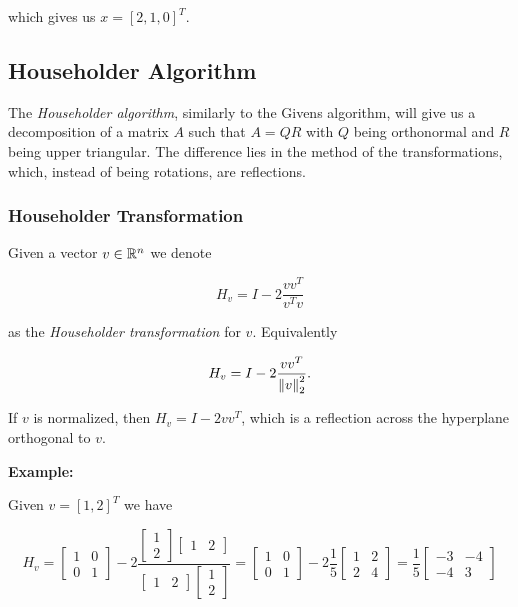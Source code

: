 which gives us \(x = [2, 1, 0]^T\).

\subsection{Householder Algorithm}

The \emph{Householder algorithm}, similarly to the Givens algorithm, will give us a decomposition of a matrix \(A\) 
such that \(A = QR\) with \(Q\) being orthonormal and \(R\) being upper triangular. The difference lies in the method of the transformations, 
which, instead of being rotations, are reflections.

\subsubsection{Householder Transformation}

Given a vector \(v \in \mathbb{R}^n\) we denote 

\[
    H_v = I - 2 \frac{vv^T}{v^Tv}
\]

as the \emph{Householder transformation} for \(v\). Equivalently 

\[
    H_v = I - 2 \frac{vv^T}{\left\| v \right\|_2^2}.
\]

If \(v\) is normalized, then \(H_v = I - 2 vv^T\), which is a reflection across the hyperplane orthogonal to \(v\).

\textbf{Example:}

Given \(v = [1, 2]^T\) we have

\[
    H_v = 
    \begin{bmatrix}
        1 & 0 \\ 
        0 & 1
    \end{bmatrix}
    - 2
    \frac{
        \begin{bmatrix}
            1 \\ 2
        \end{bmatrix}
        \begin{bmatrix}
            1 & 2
        \end{bmatrix}
    }{\begin{bmatrix}
        1 & 2
    \end{bmatrix}    
    \begin{bmatrix}
        1 \\ 2
    \end{bmatrix}}
    =
    \begin{bmatrix}
        1 & 0 \\ 
        0 & 1
    \end{bmatrix}
    - 2 \frac{1}{5}
    \begin{bmatrix}
        1 & 2 \\ 
        2 & 4
    \end{bmatrix}
    =
    \frac{1}{5}
    \begin{bmatrix}
        -3 & -4 \\ 
        -4 & 3
    \end{bmatrix}
\]


